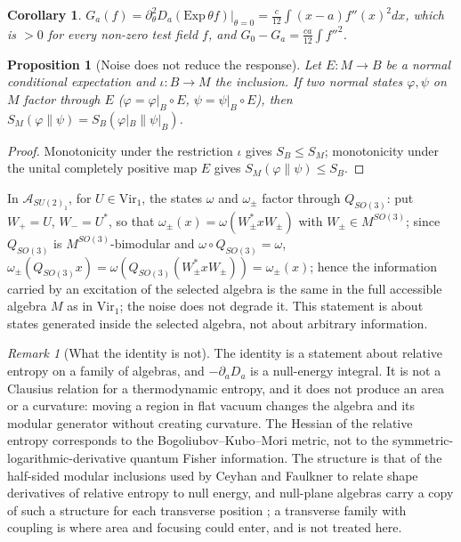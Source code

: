 \documentclass[12pt]{article}
\newtheorem{proposition}[theorem]{Proposition}
\newtheorem{corollary}[theorem]{Corollary}
\theoremstyle{definition}
\theoremstyle{remark}
\newtheorem{remark}[theorem]{Remark}
\begin{document}
\begin{corollary}\label{cor:hessian}
\(G_a(f)=\partial^2_\theta D_a(\mathrm{Exp}\,\theta f)|_{\theta=0}=\frac c{12}\int(x-a)f''(x)^2dx\), which is \(>0\) for every non-zero test field \(f\),
and \(G_0-G_a=\tfrac{ca}{12}\int f''^2\).
\end{corollary}

\begin{proposition}[Noise does not reduce the response]\label{prop:Fprime}
Let \(E:M\to B\) be a normal conditional expectation and \(\iota:B\to M\) the
inclusion. If two normal states \(\varphi,\psi\) on \(M\) factor through \(E\)
(\(\varphi=\varphi|_B\circ E\), \(\psi=\psi|_B\circ E\)), then
\(S_M(\varphi\|\psi)=S_B(\varphi|_B\|\psi|_B)\).
\end{proposition}
\begin{proof}
Monotonicity under the restriction \(\iota\) gives \(S_B\le S_M\); monotonicity under
the unital completely positive map \(E\) gives \(S_M(\varphi\|\psi)\le S_B\).
\end{proof}
In \(\mathcal A_{SU(2)_1}\), for \(U\in\mathrm{Vir}_1\), the states \(\omega\) and
\(\omega_\pm\) factor through \(Q_{SO(3)}\): put \(W_+=U\), \(W_-=U^*\), so that
\(\omega_\pm(x)=\omega(W_\pm^*xW_\pm)\) with \(W_\pm\in M^{SO(3)}\); since \(Q_{SO(3)}\) is
\(M^{SO(3)}\)-bimodular and \(\omega\circ Q_{SO(3)}=\omega\),
\(\omega_\pm(Q_{SO(3)}x)=\omega(Q_{SO(3)}(W_\pm^*xW_\pm))=\omega_\pm(x)\); hence the information
carried by an excitation of the selected algebra is the same in the full accessible
algebra \(M\) as in \(\mathrm{Vir}_1\); the noise does not degrade it. This statement is
about states generated inside the selected algebra, not about arbitrary information.

\begin{remark}[What the identity is not]
The identity is a statement about relative entropy on a family of algebras, and
\(-\partial_aD_a\) is a null-energy integral. It is not a Clausius relation for a
thermodynamic entropy, and it does not produce an area or a curvature: moving a
region in flat vacuum changes the algebra and its modular generator without creating
curvature. The Hessian of the relative entropy corresponds to the Bogoliubov--Kubo--Mori
metric, not to the symmetric-logarithmic-derivative quantum Fisher information. The
structure is that of the half-sided modular inclusions used by Ceyhan and Faulkner
\cite{CF} to relate shape derivatives of relative entropy to null energy, and null-plane
algebras carry a copy of such a structure for each transverse position \cite{CTT}; a
transverse family with coupling is where area and focusing could enter, and is not
treated here.
\end{remark}
\end{document}
